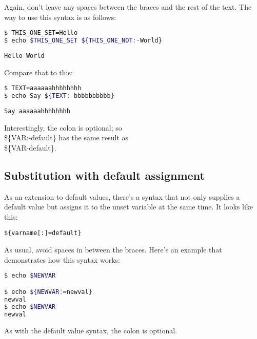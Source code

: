 Again, don't leave any spaces between the braces and the rest of the text. The
way to use this syntax is as follows:

\lstset{basicstyle=\scriptsize, numbers=left, captionpos=b, tabsize=4}
\begin{lstlisting}[caption=Default values,language={bash},
breaklines=true,xleftmargin=15pt,label=lst:Default values]
$ THIS_ONE_SET=Hello
$ echo $THIS_ONE_SET ${THIS_ONE_NOT:-World}
\end{lstlisting}
\scriptsize
\begin{verbatim}
Hello World
\end{verbatim}
\normalsize

Compare that to this:
\lstset{basicstyle=\scriptsize, numbers=left, captionpos=b, tabsize=4}
\begin{lstlisting}[caption=Default not needed,language={bash},
breaklines=true,xleftmargin=15pt,label=lst:Default not needed]
$ TEXT=aaaaaahhhhhhhh
$ echo Say ${TEXT:-bbbbbbbbbb}
\end{lstlisting}
\scriptsize
\begin{verbatim}
Say aaaaaahhhhhhhh
\end{verbatim}
\normalsize
Interestingly, the colon is optional; so\\ \$\{VAR:-default\} has the same result
as\\ \$\{VAR-default\}.

\subsection{Substitution with default assignment}
As an extension to default values, there's a syntax that not only supplies a
default value but assigns it to the unset variable at the same time. It looks
like this:
\begin{verbatim}
${varname[:]=default}
\end{verbatim}
\normalsize

As usual, avoid spaces in between the braces. Here's an example that
demonstrates how this syntax works:
\lstset{basicstyle=\scriptsize, numbers=left, captionpos=b, tabsize=4}
\begin{lstlisting}[caption=Default value assignment,language={bash},
breaklines=true,xleftmargin=15pt,label=lst:Default value assignment]
$ echo $NEWVAR

$ echo ${NEWVAR:=newval}
newval
$ echo $NEWVAR
newval
\end{lstlisting}

As with the default value syntax, the colon is optional.

